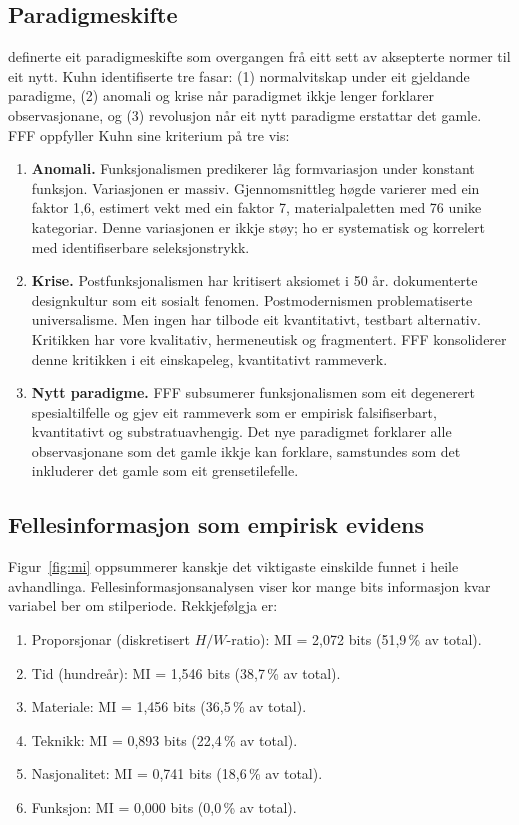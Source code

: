 \documentclass[10pt, a4paper, twocolumn]{article}
\begin{document}
\subsection{Paradigmeskifte}

\citet{kuhn1962} definerte eit paradigmeskifte som overgangen frå eitt sett av aksepterte normer til eit nytt. Kuhn identifiserte tre fasar: (1) normalvitskap under eit gjeldande paradigme, (2) anomali og krise når paradigmet ikkje lenger forklarer observasjonane, og (3) revolusjon når eit nytt paradigme erstattar det gamle. FFF oppfyller Kuhn sine kriterium på tre vis:

\begin{enumerate}
  \item \textbf{Anomali.} Funksjonalismen predikerer låg formvariasjon under konstant funksjon. Variasjonen er massiv. Gjennomsnittleg høgde varierer med ein faktor 1,6, estimert vekt med ein faktor 7, materialpaletten med 76 unike kategoriar. Denne variasjonen er ikkje støy; ho er systematisk og korrelert med identifiserbare seleksjonstrykk.
  \item \textbf{Krise.} Postfunksjonalismen har kritisert aksiomet i 50 år. \citet{sparke2004} dokumenterte designkultur som eit sosialt fenomen. Postmodernismen problematiserte universalisme. Men ingen har tilbode eit kvantitativt, testbart alternativ. Kritikken har vore kvalitativ, hermeneutisk og fragmentert. FFF konsoliderer denne kritikken i eit einskapeleg, kvantitativt rammeverk.
  \item \textbf{Nytt paradigme.} FFF subsumerer funksjonalismen som eit degenerert spesialtilfelle og gjev eit rammeverk som er empirisk falsifiserbart, kvantitativt og substratuavhengig. Det nye paradigmet forklarer alle observasjonane som det gamle ikkje kan forklare, samstundes som det inkluderer det gamle som eit grensetilefelle.
\end{enumerate}

\subsection{Fellesinformasjon som empirisk evidens}

Figur~\ref{fig:mi} oppsummerer kanskje det viktigaste einskilde funnet i heile avhandlinga. Fellesinformasjonsanalysen viser kor mange bits informasjon kvar variabel ber om stilperiode. Rekkjefølgja er:

\begin{enumerate}
  \item Proporsjonar (diskretisert $H/W$-ratio): MI = 2,072 bits (51,9\,\% av total).
  \item Tid (hundreår): MI = 1,546 bits (38,7\,\% av total).
  \item Materiale: MI = 1,456 bits (36,5\,\% av total).
  \item Teknikk: MI = 0,893 bits (22,4\,\% av total).
  \item Nasjonalitet: MI = 0,741 bits (18,6\,\% av total).
  \item Funksjon: MI = 0,000 bits (0,0\,\% av total).
\end{enumerate}
\end{document}
